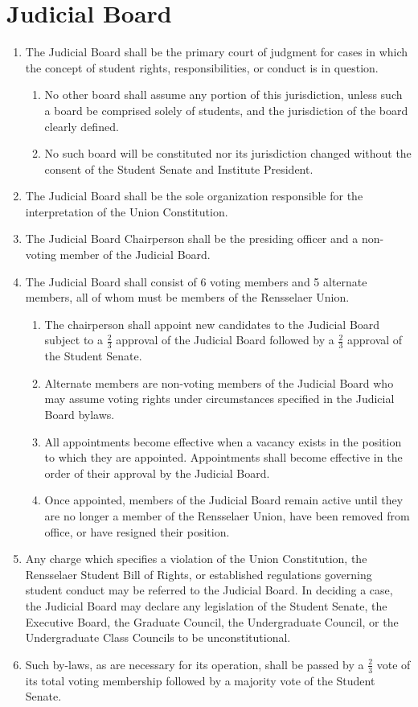 \documentclass[12pt]{constitution}
\begin{document}
\section{Judicial Board}
\begin{enumerate}
\item The Judicial Board shall be the primary court of judgment for cases in which the concept of student rights, responsibilities, or conduct is in question.
\begin{enumerate}
\item No other board shall assume any portion of this jurisdiction, unless such a board be comprised solely of students, and the jurisdiction of the board clearly defined.
\item No such board will be constituted nor its jurisdiction changed without the consent of the Student Senate and Institute President.
\end{enumerate}
\item The Judicial Board shall be the sole organization responsible for the interpretation of the Union Constitution.
\item The Judicial Board Chairperson shall be the presiding officer and a non-voting member of the
Judicial Board.
\item The Judicial Board shall consist of 6 voting members and 5 alternate members, all of whom must
be members of the Rensselaer Union.
\begin{enumerate}
\item The chairperson shall appoint new candidates to the Judicial Board subject to a $\frac{2}{3}$ approval of the Judicial Board followed by a $\frac{2}{3}$ approval of the Student Senate.
\item Alternate members are non-voting members of the Judicial Board who may assume voting rights under circumstances specified in the Judicial Board bylaws.
\item All appointments become effective when a vacancy exists in the position to which they are appointed. Appointments shall become effective in the order of their approval by the Judicial Board.
\item Once appointed, members of the Judicial Board remain active until they are no longer a member of the Rensselaer Union, have been removed from office, or have resigned their position.
\end{enumerate}
\item Any charge which specifies a violation of the Union Constitution, the Rensselaer Student Bill of
Rights, or established regulations governing student conduct may be referred to the Judicial
Board. In deciding a case, the Judicial Board may declare any legislation of the Student Senate,
the Executive Board, the Graduate Council, the Undergraduate Council, or the Undergraduate
Class Councils to be unconstitutional.
\item Such by-laws, as are necessary for its operation, shall be passed by a $\frac{2}{3}$ vote of its total voting
membership followed by a majority vote of the Student Senate.

\end{enumerate}
\end{document}
